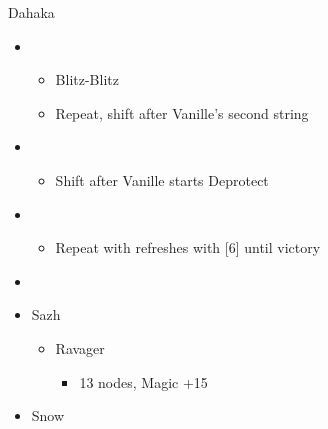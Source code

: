 \begin{multicols}{2}
\begin{battle}[1:30]{Dahaka}
\begin{itemize}
\begin{itemize}
            \end{itemize}
      \item \second
            \begin{itemize}
              \item Blitz-Blitz
              \item Repeat, shift after Vanille's second string
            \end{itemize}
      \item \fifth
            \begin{itemize}
              \item Shift after Vanille starts Deprotect
            \end{itemize}
      \item \fourth
            \begin{itemize}
              \item Repeat with refreshes with [6] until victory
            \end{itemize}
    \end{itemize}
  \end{battle}
  \begin{menu}
    \begin{itemize}
      \paradigm
      \begin{itemize}
        \item {}%
              {}%
              {\paradigmline{(\rav)}{\rav}{\rav}}%
              {\paradigmline{\rav}{(\rav)}{(\med)}}%
              {\paradigmline{\com}{\com}{(\med)}}%
              {\paradigmline[5]{\textit{\rav}}{\textit{(\rav)}}{\textit{\sab}}}%
              {\paradigmline{\com}{\com}{\rav}}
      \end{itemize}
      \crystarium
      \begin{itemize}
        \item Sazh
              \begin{itemize}
                \item Ravager
                      \begin{itemize}
                        \item 13 nodes, Magic +15
                      \end{itemize}
              \end{itemize}
        \item Snow
              \begin{itemize}

\end{itemize}
\end{itemize}
\end{itemize}
\end{menu}
\end{multicols}
